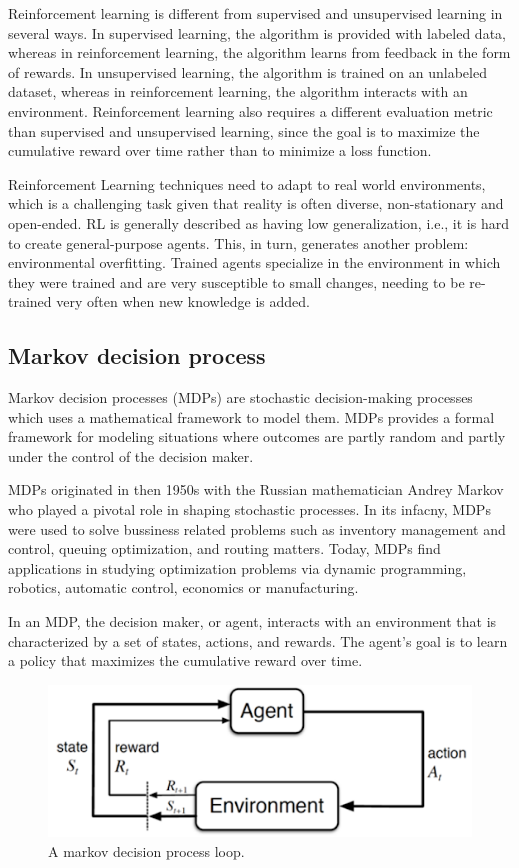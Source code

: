 Reinforcement learning is different from supervised and unsupervised learning in several ways. In supervised learning, the algorithm is provided with labeled data, whereas in reinforcement learning, the algorithm learns from feedback in the form of rewards. In unsupervised learning, the algorithm is trained on an unlabeled dataset, whereas in reinforcement learning, the algorithm interacts with an environment. Reinforcement learning also requires a different evaluation metric than supervised and unsupervised learning, since the goal is to maximize the cumulative reward over time rather than to minimize a loss function.

Reinforcement Learning techniques need to adapt to real world environments, which is a challenging task given that reality is often diverse, non-stationary and open-ended. RL is generally described as having low generalization, i.e., it is hard to create general-purpose agents. This, in turn, generates another problem: environmental overfitting. Trained agents specialize in the environment in which they were trained and are very susceptible to small changes, needing to be re-trained very often when new knowledge is added\cite{}.

\subsection*{Markov decision process}
Markov decision processes (MDPs) are stochastic decision-making processes which uses a mathematical framework to model them. MDPs provides a formal framework for modeling situations where outcomes are partly random and partly under the control of the decision maker. 

MDPs originated in then 1950s with the Russian mathematician Andrey Markov who played a pivotal role in shaping stochastic processes. In its infacny, MDPs were used to solve bussiness related problems such as inventory management and control, queuing optimization, and routing matters. Today, MDPs find applications in studying optimization problems via dynamic programming, robotics, automatic control, economics or manufacturing.

In an MDP, the decision maker, or agent, interacts with an environment that is characterized by a set of states, actions, and rewards. The agent's goal is to learn a policy that maximizes the cumulative reward over time.

\begin{figure}[!htp]
    \centering
    \includegraphics[width=.6\textwidth]{fig/rl/MDP-model.png}
    \caption{A markov decision process loop.}
    \label{fig:MDP}
\end{figure}

